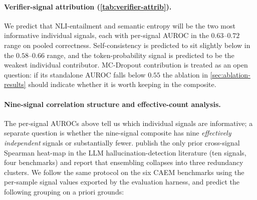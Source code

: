 \paragraph{Verifier-signal attribution (\cref{tab:verifier-attrib}).}
We predict that NLI-entailment and semantic entropy will be the two
most informative individual signals, each with per-signal AUROC in
the $0.63$--$0.72$ range on pooled correctness. Self-consistency is
predicted to sit slightly below in the $0.58$--$0.66$ range, and the
token-probability signal is predicted to be the weakest individual
contributor. MC-Dropout contribution is treated as an open question:
if its standalone AUROC falls below $0.55$ the ablation in
\cref{sec:ablation-results} should indicate whether it is worth
keeping in the composite.

\paragraph{Nine-signal correlation structure and effective-count
analysis.}
\label{sec:signal-correlation}
The per-signal AUROCs above tell us which individual signals are
informative; a separate question is whether the nine-signal composite
has nine \emph{effectively independent} signals or substantially
fewer. \citet{valentin2024hallucination} publish the only prior
cross-signal Spearman heat-map in the LLM hallucination-detection
literature (ten signals, four benchmarks) and report that ensembling
collapses into three redundancy clusters. We follow the same
protocol on the six CAEM benchmarks using the per-sample signal values
exported by the evaluation harness, and predict the following
grouping on a priori grounds:
